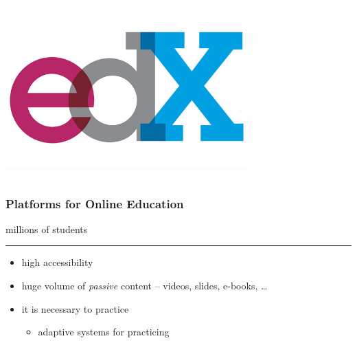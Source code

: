 \documentclass[xcolor=svgnames]{beamer}
\begin{document}
\begin{frame}
\begin{columns}[2]
\begin{center}
			\includegraphics[width=0.7\textwidth]{imgs/edx.jpg}
		\end{center}
	\end{columns}
\end{frame}
\begin{frame}
	\frametitle{Platforms for Online Education}
	\begin{center}
		\Huge millions of students
	\end{center}

	\bigskip
	\hrule

	\medskip
	\begin{itemize}
		\item 	high accessibility
		\item 	huge volume of \textit{passive} content -- videos, slides, e-books, \ldots
		\item 	\alert{it is necessary to practice}
						\begin{itemize}
							\item 	adaptive systems for practicing
						\end{itemize}
	\end{itemize}
\end{frame}
\end{document}
